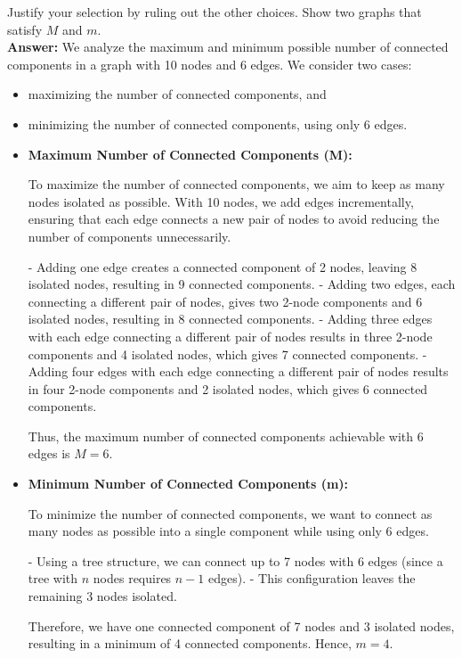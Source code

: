 \documentclass[12pt]{article}
\theoremstyle{plain}
\begin{document}
Justify your selection by ruling out the other choices. Show two graphs that satisfy $M$ and $m$. \\

\noindent \textbf{Answer: }We analyze the maximum and minimum possible number of connected components in a graph with 10 nodes and 6 edges. We consider two cases: 
\begin{itemize}
    \item maximizing the number of connected components, and
    \item minimizing the number of connected components, using only 6 edges.
\end{itemize}

\begin{itemize}
    \item[(1)] {\bf Maximum Number of Connected Components (M):}
    
    To maximize the number of connected components, we aim to keep as many nodes isolated as possible. With 10 nodes, we add edges incrementally, ensuring that each edge connects a new pair of nodes to avoid reducing the number of components unnecessarily.

    - Adding one edge creates a connected component of 2 nodes, leaving 8 isolated nodes, resulting in 9 connected components.
    - Adding two edges, each connecting a different pair of nodes, gives two 2-node components and 6 isolated nodes, resulting in 8 connected components.
    - Adding three edges with each edge connecting a different pair of nodes results in three 2-node components and 4 isolated nodes, which gives 7 connected components.
    - Adding four edges with each edge connecting a different pair of nodes results in four 2-node components and 2 isolated nodes, which gives 6 connected components.

    \noindent Thus, the maximum number of connected components achievable with 6 edges is \( M = 6 \).

    \item[(2)] {\bf Minimum Number of Connected Components (m):}

    To minimize the number of connected components, we want to connect as many nodes as possible into a single component while using only 6 edges.

    - Using a tree structure, we can connect up to 7 nodes with 6 edges (since a tree with \( n \) nodes requires \( n-1 \) edges).
    - This configuration leaves the remaining 3 nodes isolated.

    \noindent Therefore, we have one connected component of 7 nodes and 3 isolated nodes, resulting in a minimum of 4 connected components. Hence, \( m = 4 \).
\end{itemize}
\end{document}
